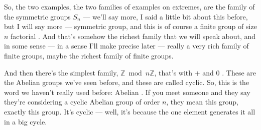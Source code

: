 \begin{speech}[00:01:02 - 00:02:02]
So, the two examples, the two families of examples on extremes, are the family of the symmetric groups $S_n$  --- we'll say more, I said a little bit about this before, but I will say more --- symmetric group, and this is of course a finite group of size $n$ factorial . And that's somehow the richest family that we will speak about, and in some sense --- in a sense I'll make precise later --- really a very rich family of finite groups, maybe the richest family of finite groups.

And then there's the simplest family, $\mathbb{Z} \bmod n\mathbb{Z}$, that's with $+$ and $0$ . These are the Abelian groups we've seen before, and these are called cyclic. So, this is the word we haven't really used before:  Abelian . If you meet someone and they say they're considering a cyclic Abelian group of order $n$, they mean this group, exactly this group. It's cyclic --- well, it's because the one element generates it all in a big cycle.
\end{speech}

\begin{content}
\end{content}

